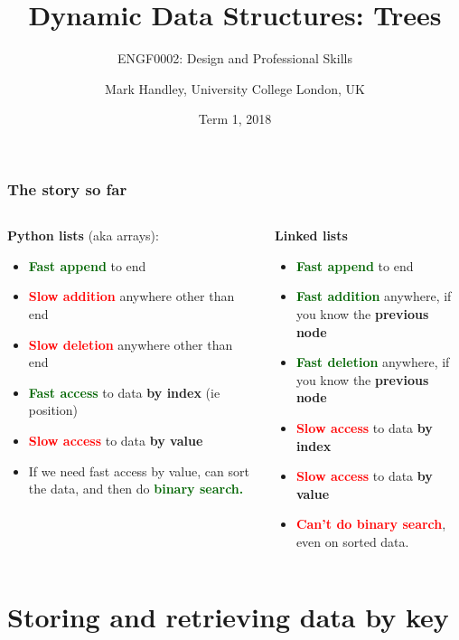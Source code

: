 \documentclass{beamer} %
\author{Mark Handley, University College London, UK}
\title{Dynamic Data Structures: Trees}
\subtitle{ENGF0002: Design and Professional Skills }
\date{Term 1, 2018}
\newcommand\good[1]{\textcolor{darkgreen}{\textbf{#1}}}
\newcommand\bad[1]{\textcolor{red}{\textbf{#1}}}
\begin{document}
\nobibliography*


\frame{
\titlepage
}

\begin{frame}
  \frametitle{The story so far} %
  \begin{columns}
\begin{column}{0.5\textwidth}
  \textbf{Python lists} (aka arrays):
  \begin{itemize}
  \item \good{Fast append} to end
  \item \bad{Slow addition} anywhere other than end
  \item \bad{Slow deletion} anywhere other than end
  \item \good{Fast access} to data \textbf{by index} (ie position)
  \item \bad{Slow access} to data \textbf{by value}
  \item If we need fast access by value, can sort the data, and then do \good{binary search.}
  \end{itemize}
\end{column}
\begin{column}{0.5\textwidth}
  \textbf{Linked lists}
  \begin{itemize}
  \item \good{Fast append} to end
  \item \good{Fast addition} anywhere, if you know the \textbf{previous node}
  \item \good{Fast deletion} anywhere, if you know the \textbf{previous node}
  \item \bad{Slow access} to data \textbf{by index}
  \item \bad{Slow access} to data \textbf{by value}
  \item \bad{Can't do binary search}, even on sorted data.
  \end{itemize}
\end{column}
\end{columns}
\end{frame}

\section{Storing and retrieving data by key}
\end{document}
